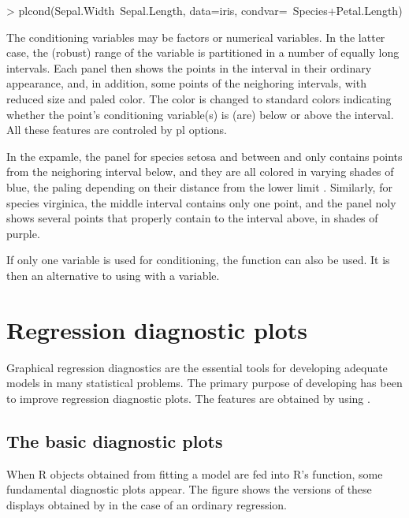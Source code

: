 \documentclass[11pt]{article}
\begin{document}
\begin{Schunk}
\begin{Sinput}
> plcond(Sepal.Width~Sepal.Length, data=iris, condvar=~Species+Petal.Length)
\end{Sinput}
\end{Schunk}
The conditioning variables may be factors or numerical variables.
In the latter case, the (robust) range of the variable is partitioned
in a number of equally long intervals. 
Each panel then shows the points in the interval in their ordinary appearance,
and, in addition, some points of the neighoring intervals, with reduced size
and paled color. The color is changed to standard colors indicating whether 
the point's conditioning variable(s) is (are) below or above the interval.
All these features are controled by pl options.

In the expamle, the panel for species setosa and  between
 and  only contains points from the neighoring interval
below, and they are all colored in varying shades of blue, the paling
depending on their distance from the lower limit .
Similarly, for species virginica, the middle interval contains only one 
point, and the panel noly shows several points that properly contain to the
interval above, in shades of purple.

If only one variable is used for conditioning, the function can also 
be used. It is then an alternative to using  with 
a  variable.

\section{Regression diagnostic plots}
Graphical regression diagnostics are the essential tools for developing
adequate models in many statistical problems.
The primary purpose of developing  has been to improve
regression diagnostic plots.
The features are obtained by using .

\subsection{The basic diagnostic plots}
When R objects obtained from fitting a model are fed into R's 
function, some fundamental diagnostic plots appear. 
The figure shows the versions of these displays obtained by 
in the case of an ordinary regression.
\end{document}
